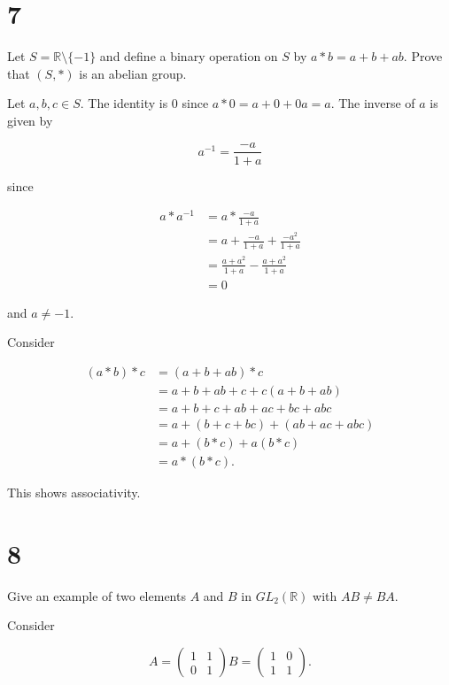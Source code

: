 \documentclass[a4paper]{article}
\begin{document}
\section*{7}

Let $S = \mathbb{R} \setminus \{ -1 \}$ and define a binary operation on $S$ by $a * b = a + b + ab$. Prove that $(S, *)$ is an abelian group.

\vspace{\baselineskip}

Let $a, b, c \in S$. The identity is 0 since $a * 0 = a + 0 + 0a = a$. The inverse of $a$ is given by 

$$ a^{-1} = \frac{-a}{1+a}$$

since

\begin{align*}
a * a^{-1} &= a * \frac{-a}{1+a} \\
&= a + \frac{-a}{1+a} + \frac{-a^2}{1+a} \\
&= \frac{a + a^2}{1+a} - \frac{a + a^2}{1+a} \\
&= 0
\end{align*}

and $a \neq -1$.

Consider

\begin{align*}
(a * b) * c &= (a + b + ab) * c \\
&= a + b + ab + c + c (a + b + ab) \\
&= a + b + c + ab + ac + bc + abc \\
&= a + (b + c + bc) + (ab + ac + abc) \\
&= a + (b * c) + a (b * c) \\
&= a * (b * c).
\end{align*}

This shows associativity.

\section*{8}

Give an example of two elements $A$ and $B$ in $GL_2(\mathbb{R})$ with $AB \neq BA$.

\vspace{\baselineskip}

Consider

$$A=
  \begin{pmatrix}
    1 & 1 \\
    0 & 1
  \end{pmatrix}
  B=
  \begin{pmatrix}
    1 & 0 \\
    1 & 1
  \end{pmatrix}.
$$
\end{document}
